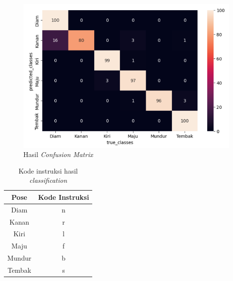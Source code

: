 \begin{figure}[H]
  \centering
  \includegraphics[width=0.7\linewidth]{gambar/confusionmatrix.png}
  \caption{Hasil \emph{Confusion Matrix}}
  \label{fig:confusionmatrix}
\end{figure}

\begin{table}[H]
  \centering
  \caption{Kode instruksi hasil \emph{classification}}
  \label{tab:kodeinstruksi}
  \begin{tabular}{|c|c|}
  \hline
  Pose   & Kode Instruksi \\ \hline
  Diam   & n              \\ \hline
  Kanan  & r              \\ \hline
  Kiri   & l              \\ \hline
  Maju   & f              \\ \hline
  Mundur & b              \\ \hline
  Tembak & s              \\ \hline
  \end{tabular}
\end{table}


